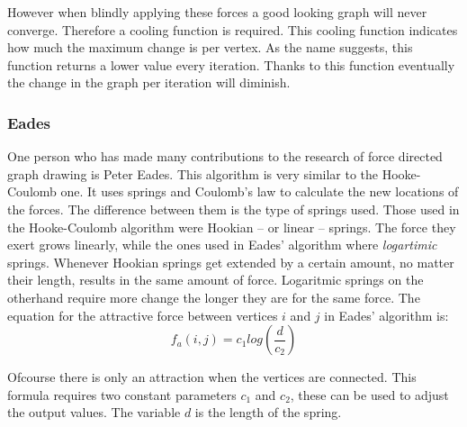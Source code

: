 \documentclass[a4paper,12pt]{article}
\begin{document}
    However when blindly applying these forces a good looking graph will never converge.
    Therefore a cooling function is required.
    This cooling function indicates how much the maximum change is per vertex.
    As the name suggests, this function returns a lower value every iteration.
    Thanks to this function eventually the change in the graph per iteration will diminish.

    \subsubsection{Eades}
    One person who has made many contributions to the research of force directed graph drawing is Peter Eades.
    This algorithm is very similar to the Hooke-Coulomb one.
    It uses springs and Coulomb's law to calculate the new locations of the forces.
    The difference between them is the type of springs used.
    Those used in the Hooke-Coulomb algorithm were Hookian -- or linear -- springs.
    The force they exert grows linearly, while the ones used in Eades' algorithm where \emph{logartimic} springs.
    Whenever Hookian springs get extended by a certain amount, no matter their length, results in the same amount of force.
    Logaritmic springs on the otherhand require more change the longer they are for the same force.
    The equation for the attractive force between vertices $i$ and $j$ in Eades' algorithm is:
    \begin{equation}\label{eq:Eades_a}
      f_a(i,j) = c_1 log(\frac{d}{c_2})
    \end{equation}

    Ofcourse there is only an attraction when the vertices are connected.
    This formula requires two constant parameters $c_1$ and $c_2$, these can be used to adjust the output values.
    The variable $d$ is the length of the spring.\cite{eades1984heuristic}
\end{document}
